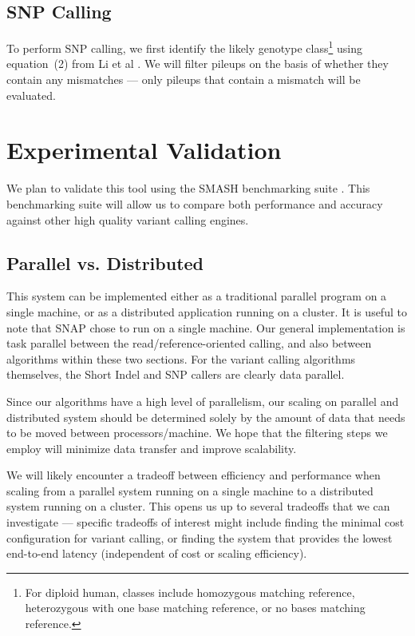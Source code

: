 \documentclass[11pt]{article}
\begin{document}
\subsection{SNP Calling}
\label{sec:SNP-calling}

To perform SNP calling, we first identify the likely genotype class\footnote{For diploid human, classes include homozygous
matching reference, heterozygous with one base matching reference, or no bases matching reference.} using equation~(2)
from Li et al \cite{li11}. We will filter pileups on the basis of whether they contain any mismatches --- only pileups that contain
a mismatch will be evaluated.

\section{Experimental Validation}
\label{sec:experimental-validation}

We plan to validate this tool using the SMASH benchmarking suite \cite{talwalkar13}. This benchmarking suite will allow us to
compare both performance and accuracy against other high quality variant calling engines.

\subsection{Parallel vs. Distributed}
\label{sec:parallel-vs-distributed}

This system can be implemented either as a traditional parallel program on a single machine, or as a distributed application
running on a cluster. It is useful to note that SNAP \cite{zaharia11} chose to run on a single machine. Our general implementation
is task parallel between the read/reference-oriented calling, and also between algorithms within these two sections. For the
variant calling algorithms themselves, the Short Indel and SNP callers are clearly data parallel.

Since our algorithms have a high level of parallelism, our scaling on parallel and distributed system should be determined solely
by the amount of data that needs to be moved between processors/machine. We hope that the filtering steps we employ will
minimize data transfer and improve scalability.

We will likely encounter a tradeoff between efficiency and performance when scaling from a parallel system running on a single
machine to a distributed system running on a cluster. This opens us up to several tradeoffs that we can investigate --- specific
tradeoffs of interest might include finding the minimal cost configuration for variant calling, or finding the system that provides
the lowest end-to-end latency (independent of cost or scaling efficiency).
\end{document}
